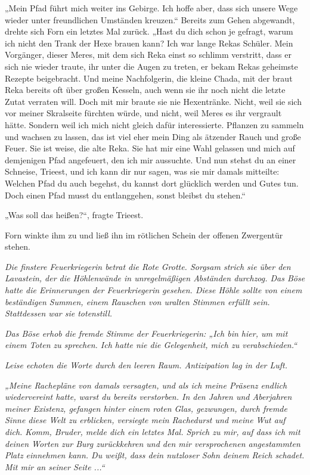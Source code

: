 „Mein Pfad führt mich weiter ins Gebirge. Ich hoffe aber, dass sich unsere Wege wieder unter freundlichen Umständen kreuzen.“ Bereits zum Gehen abgewandt, drehte sich Forn ein letztes Mal zurück. „Hast du dich schon je gefragt, warum ich nicht den Trank der Hexe brauen kann? Ich war lange Rekas Schüler. Mein Vorgänger, dieser Meres, mit dem sich Reka einst so schlimm verstritt, dass er sich nie wieder traute, ihr unter die Augen zu treten, er bekam Rekas geheimste Rezepte beigebracht. Und meine Nachfolgerin, die kleine Chada, mit der braut Reka bereits oft über großen Kesseln, auch wenn sie ihr noch nicht die letzte Zutat verraten will. Doch mit mir braute sie nie Hexentränke. Nicht, weil sie sich vor meiner Skralseite fürchten würde, und nicht, weil Meres es ihr vergrault hätte. Sondern weil ich mich nicht gleich dafür interessierte. Pflanzen zu sammeln und wachsen zu lassen, das ist viel eher mein Ding als ätzender Rauch und große Feuer. Sie ist weise, die alte Reka. Sie hat mir eine Wahl gelassen und mich auf demjenigen Pfad angefeuert, den ich mir aussuchte. Und nun stehst du an einer Schneise, Trieest, und ich kann dir nur sagen, was sie mir damals mitteilte: Welchen Pfad du auch begehst, du kannst dort glücklich werden und Gutes tun. Doch einen Pfad musst du entlanggehen, sonst bleibst du stehen.“

„Was soll das heißen?“, fragte Trieest.

Forn winkte ihm zu und ließ ihn im rötlichen Schein der offenen Zwergentür stehen.\bigskip







\textit{Die finstere Feuerkriegerin betrat die Rote Grotte. Sorgsam strich sie über den Lavastein, der die Höhlenwände in unregelmäßigen Abständen durchzog. Das Böse hatte die Erinnerungen der Feuerkriegerin gesehen. Diese Höhle sollte von einem beständigen Summen, einem Rauschen von uralten Stimmen erfüllt sein. Stattdessen war sie totenstill.}

\textit{Das Böse erhob die fremde Stimme der Feuerkriegerin: „Ich bin hier, um mit einem Toten zu sprechen. Ich hatte nie die Gelegenheit, mich zu verabschieden.“}

\textit{Leise echoten die Worte durch den leeren Raum. Antizipation lag in der Luft.}

\textit{„Meine Rachepläne von damals versagten, und als ich meine Präsenz endlich wiedervereint hatte, warst du bereits verstorben. In den Jahren und Aberjahren meiner Existenz, gefangen hinter einem roten Glas, gezwungen, durch fremde Sinne diese Welt zu erblicken, versiegte mein Rachedurst und meine Wut auf dich. Komm, Bruder, melde dich ein letztes Mal. Sprich zu mir, auf dass ich mit deinen Worten zur Burg zurückkehren und den mir versprochenen angestammten Platz einnehmen kann. Du weißt, dass dein nutzloser Sohn deinem Reich schadet. Mit mir an seiner Seite ...“}

